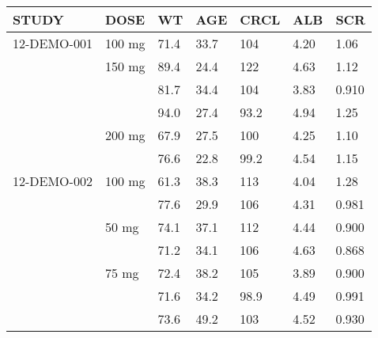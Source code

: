 {\def\arraystretch{1.4}\tabcolsep=5pt
\begin{threeparttable}
\begin{tabular}[h]{lllllll}
\hline
STUDY & DOSE & WT & AGE & CRCL & ALB & SCR \\
\hline
12-DEMO-001 & 100 mg & 71.4 & 33.7 & 104 & 4.20 & 1.06 \\
 & 150 mg & 89.4 & 24.4 & 122 & 4.63 & 1.12 \\
 &  & 81.7 & 34.4 & 104 & 3.83 & 0.910 \\
 &  & 94.0 & 27.4 & 93.2 & 4.94 & 1.25 \\
 & 200 mg & 67.9 & 27.5 & 100 & 4.25 & 1.10 \\
 &  & 76.6 & 22.8 & 99.2 & 4.54 & 1.15 \\
12-DEMO-002 & 100 mg & 61.3 & 38.3 & 113 & 4.04 & 1.28 \\
 &  & 77.6 & 29.9 & 106 & 4.31 & 0.981 \\
 & 50 mg & 74.1 & 37.1 & 112 & 4.44 & 0.900 \\
 &  & 71.2 & 34.1 & 106 & 4.63 & 0.868 \\
 & 75 mg & 72.4 & 38.2 & 105 & 3.89 & 0.900 \\
 &  & 71.6 & 34.2 & 98.9 & 4.49 & 0.991 \\
 &  & 73.6 & 49.2 & 103 & 4.52 & 0.930 \\
\hline
\end{tabular}
\end{threeparttable}
}
